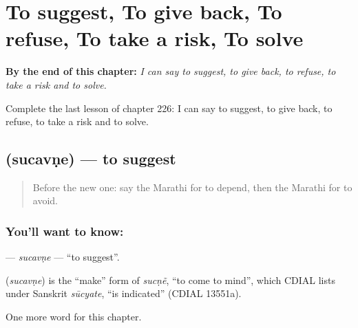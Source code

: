 
\chapter{To suggest, To give back, To refuse, To take a risk, To solve}
\label{ch:mr-to-suggest-to-give-back-to-refuse-to-take-a-risk-to-solve}

\begin{chapteropening}
\textbf{By the end of this chapter:} \emph{I can say to suggest, to give back, to refuse, to take a risk and to solve.}

Complete the last lesson of chapter 226: I can say to suggest, to give back, to refuse, to take a risk and to solve.
\end{chapteropening}

\section[\texorpdfstring{\mr{सुचवणे} (sucavṇe)}{सुचवणे (sucavṇe)}]{ (sucavṇe) — to suggest}

\label{lesson:MR-C226-sucavne}



\begin{quote}
Before the new one: say the Marathi for to depend, then the Marathi for to avoid.
\end{quote}

\subsection*{You'll want to know: }
\textbf{} — \emph{sucavṇe} — \textquotedblleft{}to suggest\textquotedblright{}.

\begin{cousinweb}
\textbf{} (\emph{sucavṇe}) is the \textquotedblleft{}make\textquotedblright{} form of \emph{sucṇẽ}, \textquotedblleft{}to come to mind\textquotedblright{}, which CDIAL lists under Sanskrit \emph{sūcyate}, \textquotedblleft{}is indicated\textquotedblright{} (CDIAL 13551a).
\end{cousinweb}

\begin{grammarlens}[title={What you've built}]
One more word for this chapter.
\end{grammarlens}

